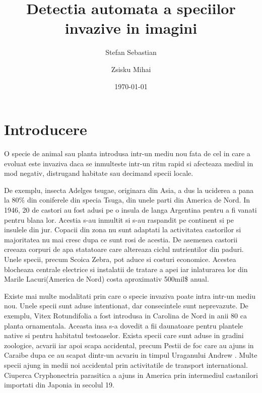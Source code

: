 \documentclass{article}
\begin{document}
\title{Detectia automata a speciilor invazive in imagini}
\author{Stefan Sebastian \and Zsisku Mihai}
\date{\today}
\maketitle

\newpage

\tableofcontents

\newpage

\section{Introducere}
O specie de animal sau planta introdusa intr-un mediu nou fata de cel in care a evoluat este invaziva daca se inmulteste intr-un ritm rapid si afecteaza mediul in mod negativ, distrugand habitate sau decimand specii locale\cite{WEBSITE:1}.
 
De exemplu, insecta Adelges tsugae, originara din Asia, a dus la uciderea a pana la 80\% din coniferele din specia Tsuga, din unele parti din America de Nord\cite{WEBSITE:2}. In 1946, 20 de castori au fost adusi pe o insula de langa Argentina pentru a fi vanati pentru blana lor. Acestia s-au inmultit si s-au raspandit pe continent si pe insulele din jur. Copacii din zona nu sunt adaptati la activitatea castorilor si majoritatea nu mai cresc dupa ce sunt rosi de acestia. De asemenea castorii creeaza corpuri de apa statatoare care altereaza ciclul nutrientilor din paduri\cite{WEBSITE:3}. Unele specii, precum Scoica Zebra, pot aduce si costuri economice. Acestea blocheaza centrale electrice si instalatii de tratare a apei iar inlaturarea lor din Marile Lacuri(America de Nord) costa aproximativ 500mil\$ anual\cite{WEBSITE:5}.

Existe mai multe modalitati prin care o specie invaziva poate intra intr-un mediu nou. Unele specii sunt aduse intentionat, dar consecintele sunt neprevazute. De exemplu, Vitex Rotundifolia a fost introdusa in Carolina de Nord in anii 80 ca planta ornamentala. Aceasta insa s-a dovedit a fii daunatoare pentru plantele native si pentru habitatul testoaselor\cite{WEBSITE:7}. Exista specii care sunt aduse in gradini zoologice, acvarii iar apoi scapa accidental, precum Pestii de foc care au ajuns in Caraibe dupa ce au scapat dintr-un acvariu in timpul Uraganului Andrew \cite{WEBSITE:8}. Multe specii ajung in medii noi accidental prin activitatile de transport international. Ciuperca Cryphonectria parasitica a ajuns in America prin intermediul castanilori importati din Japonia in secolul 19\cite{WEBSITE:9}.
\end{document}
